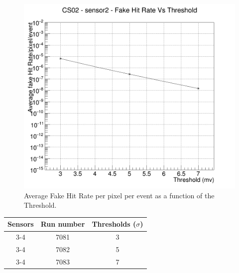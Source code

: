 \documentclass[a4papper, 10pt]{article}
\begin{document}
    \FloatBarrier 
        \begin{figure}[!h]
            \centering
            \includegraphics[width = 12cm]{Output_CS02_FHR/Fake_results_CS02_sensor2.png}
            \caption{Average Fake Hit Rate per pixel per event as a function of the Threshold.}
        \end{figure}
    \FloatBarrier 

  \begin{center}
    \begin{tabular}{|c|c|c|}
      \hline %
   \rowcolor{light-gray}  Sensors  &  Run number  &  Thresholds  ($\sigma$) \tabularnewline
      \hline %
      3-4   &   7081   &    3 \tabularnewline
      \hline %
      3-4   &   7082   &    5 \tabularnewline
      \hline %
      3-4   &   7083   &    7 \tabularnewline
      \hline %
    \end{tabular}
  \end{center}
\end{document}
